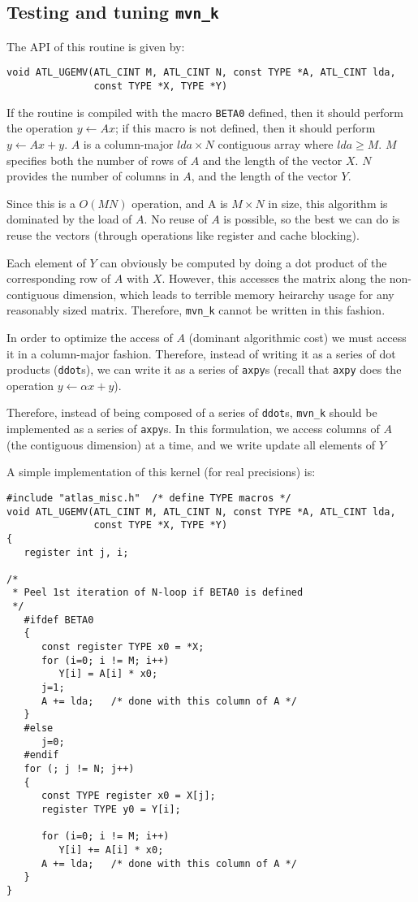 \documentclass[11pt]{article}
\newcommand{\kernk}[1]{{\tt #1\_k}}
\begin{document}
\subsection{Testing and tuning \kernk{mvn}}
The API of this routine is given by:
\begin{verbatim}
void ATL_UGEMV(ATL_CINT M, ATL_CINT N, const TYPE *A, ATL_CINT lda,
               const TYPE *X, TYPE *Y)
\end{verbatim}
If the routine is compiled with the macro {\tt BETA0} defined, then
it should perform the operation $y \leftarrow Ax$; if this macro is
not defined, then it should perform $y \leftarrow Ax + y$.
$A$ is a column-major $lda \times N$ contiguous array where $lda \ge M$.
$M$ specifies both the number of rows of $A$ and the length of the vector $X$.
$N$ provides the number of columns in $A$, and the length of the vector $Y$.

Since this is a $O(MN)$ operation, and A is $M \times N$ in size,
this algorithm is dominated by the load of $A$.  No reuse of $A$ is
possible, so the best we can do is reuse the vectors (through operations
like register and cache blocking).

Each element of $Y$ can obviously be computed by doing a dot product of
the corresponding row of $A$ with $X$.  However, this accesses the
matrix along the non-contiguous dimension, which leads to terrible memory
heirarchy usage for any reasonably sized matrix.  Therefore, \kernk{mvn}
cannot be written in this fashion.

In order to optimize the access of $A$ (dominant algorithmic cost) we must
access it in a column-major fashion.  Therefore, instead of writing it as
a series of dot products ({\tt ddot}s), we can write it as a series of 
{\tt axpy}s (recall that {\tt axpy} does the operation 
{\tt $y \leftarrow \alpha x + y$}).

Therefore, instead of being composed of a series of {\tt ddot}s, 
\kernk{mvn} should be implemented as a series of {\tt axpy}s.  In this
formulation, we access columns of $A$ (the contiguous dimension) at a time,
and we write update all elements of $Y$ 

A simple implementation of this kernel (for real precisions) is:
\begin{verbatim}
#include "atlas_misc.h"  /* define TYPE macros */
void ATL_UGEMV(ATL_CINT M, ATL_CINT N, const TYPE *A, ATL_CINT lda,
               const TYPE *X, TYPE *Y)
{
   register int j, i;

/*
 * Peel 1st iteration of N-loop if BETA0 is defined
 */
   #ifdef BETA0
   {
      const register TYPE x0 = *X;
      for (i=0; i != M; i++)
         Y[i] = A[i] * x0;
      j=1;
      A += lda;   /* done with this column of A */
   }
   #else
      j=0;
   #endif
   for (; j != N; j++)
   {
      const TYPE register x0 = X[j];
      register TYPE y0 = Y[i];

      for (i=0; i != M; i++) 
         Y[i] += A[i] * x0;
      A += lda;   /* done with this column of A */
   }
}
\end{verbatim}
\end{document}
